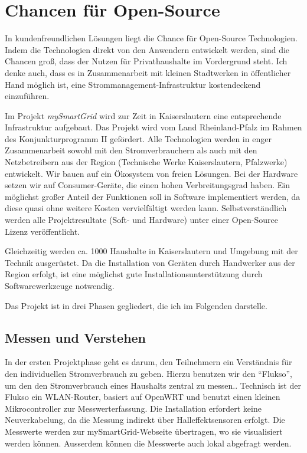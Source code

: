 \documentclass[12pt,BCOR=8.5mm]{scrartcl}
\begin{document}
\section{Chancen für Open-Source}\label{sec:chancen_open-source}
In kundenfreundlichen Lösungen liegt die Chance für Open-Source
Technologien. Indem die Technologien direkt von den Anwendern entwickelt
werden, sind die Chancen groß, dass der Nutzen für Privathaushalte im
Vordergrund steht.  Ich denke auch, dass es in Zusammenarbeit mit
kleinen Stadtwerken in öffentlicher Hand möglich ist, eine
Strommanagement-Infrastruktur kostendeckend einzuführen.

Im Projekt \emph{mySmartGrid} wird zur Zeit in Kaiserslautern eine
entsprechende Infrastruktur aufgebaut. Das Projekt wird vom Land
Rheinland-Pfalz im Rahmen des Konjunkturprogramm II gefördert. Alle
Technologien werden in enger Zusammenarbeit sowohl mit den
Stromverbrauchern als auch mit den Netzbetreibern aus der Region
(Technische Werke Kaiserslautern, Pfalzwerke) entwickelt.  Wir bauen auf
ein Ökosystem von freien Lösungen.  Bei der Hardware setzen wir auf
Consumer-Geräte, die einen hohen Verbreitungsgrad haben.  Ein möglichst
großer Anteil der Funktionen soll in Software implementiert werden, da
diese quasi ohne weitere Kosten vervielfältigt werden kann.
Selbstverständlich werden alle Projektresultate (Soft- und Hardware)
unter einer Open-Source Lizenz veröffentlicht. 

Gleichzeitig werden ca.  1000 Haushalte in Kaiserslautern und Umgebung
mit der Technik ausgerüstet. Da die Installation von Geräten durch
Handwerker aus der Region erfolgt, ist eine möglichst gute
Installationsunterstützung durch Softwarewerkzeuge notwendig.

Das Projekt ist in drei Phasen gegliedert, die ich im Folgenden
darstelle.

\subsection{Messen und Verstehen}\label{sub:messenverstehen}

In der ersten Projektphase geht es darum, den Teilnehmern ein
Verständnis für den individuellen Stromverbrauch zu geben. Hierzu
benutzen wir den "`Flukso"', um den den Stromverbrauch eines Haushalts
zentral zu messen.. Technisch ist der
Flukso ein WLAN-Router, basiert auf OpenWRT und benutzt einen kleinen
Mikrocontroller zur Messwerterfassung. Die Installation erfordert keine
Neuverkabelung, da die Messung indirekt über Halleffektsensoren erfolgt.
Die Messwerte werden zur mySmartGrid-Webseite übertragen, wo sie
visualisiert werden können. Ausserdem können die Messwerte auch lokal
abgefragt werden.
\end{document}
